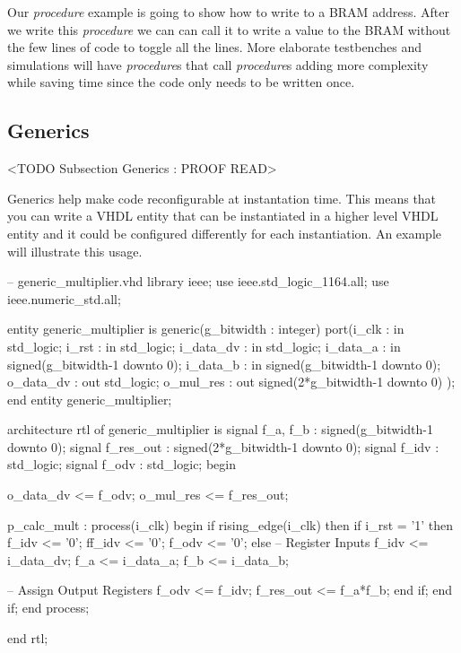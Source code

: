 Our \emph{procedure} example is going to show how to write to a \ac{BRAM} address. After we write this \emph{procedure} we can can call it to write a value to the \ac{BRAM} without the few lines of code to toggle all the lines. More elaborate testbenches and simulations will have \emph{procedure}s that call \emph{procedure}s adding more complexity while saving time since the code only needs to be written once. 


\subsection{Generics}
	<TODO Subsection Generics : PROOF READ>

Generics help make code reconfigurable at instantation time. This means that you can write a \ac{VHDL} entity that can be instantiated in a higher level \ac{VHDL} entity and it could be configured differently for each instantiation. An example will illustrate this usage. 

\begin{VHDLlisting}[tabsize=4]
-- generic_multiplier.vhd
library ieee;
	use ieee.std_logic_1164.all;
	use ieee.numeric_std.all;
	
entity generic_multiplier is
generic(g_bitwidth : integer)
port(i_clk     : in    std_logic;
	 i_rst     : in    std_logic;
	 i_data_dv : in    std_logic;
	 i_data_a  : in    signed(g_bitwidth-1 downto 0);
	 i_data_b  : in    signed(g_bitwidth-1 downto 0);
	 o_data_dv :   out std_logic; 
	 o_mul_res :   out signed(2*g_bitwidth-1 downto 0)
);
end entity generic_multiplier;

architecture rtl of generic_multiplier is
	signal f_a, f_b  : signed(g_bitwidth-1 downto 0);
	signal f_res_out : signed(2*g_bitwidth-1 downto 0);
	signal f_idv     : std_logic;
	signal f_odv     : std_logic;
begin

	o_data_dv <= f_odv;
	o_mul_res <= f_res_out;

	p_calc_mult : process(i_clk)
	begin
		if rising_edge(i_clk) then
			if i_rst = '1' then
				f_idv  <= '0';
				ff_idv <= '0';
				f_odv  <= '0';
			else
				-- Register Inputs
				f_idv <= i_data_dv;
				f_a <= i_data_a;
				f_b <= i_data_b;
							
				-- Assign Output Registers
				f_odv <= f_idv;
				f_res_out <= f_a*f_b;		
			end if;
		end if;	
	end process;

end rtl;
	 
\end{VHDLlisting}
	
